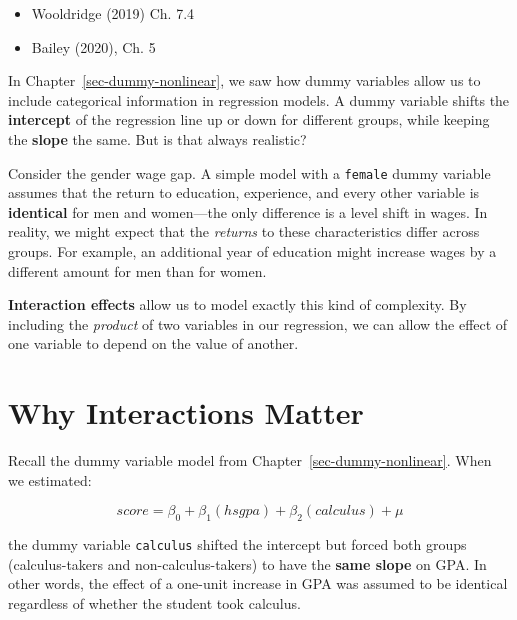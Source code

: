 \documentclass[
  letterpaper,
  DIV=11,
  numbers=noendperiod]{scrreprt}
\providecommand{\tightlist}{%
  \setlength{\itemsep}{0pt}\setlength{\parskip}{0pt}}
\begin{document}
\begin{tcolorbox}[enhanced jigsaw, arc=.35mm, bottomrule=.15mm, bottomtitle=1mm, breakable, colback=white, colbacktitle=quarto-callout-note-color!10!white, colframe=quarto-callout-note-color-frame, coltitle=black, left=2mm, leftrule=.75mm, opacityback=0, opacitybacktitle=0.6, rightrule=.15mm, title=\textcolor{quarto-callout-note-color}{\faInfo}\hspace{0.5em}{\textbf{Suggested Readings}}, titlerule=0mm, toprule=.15mm, toptitle=1mm]

\begin{itemize}
\tightlist
\item
  Wooldridge (2019) Ch. 7.4
\item
  Bailey (2020), Ch. 5
\end{itemize}

\end{tcolorbox}

In Chapter~\ref{sec-dummy-nonlinear}, we saw how dummy variables allow
us to include categorical information in regression models. A dummy
variable shifts the \textbf{intercept} of the regression line up or down
for different groups, while keeping the \textbf{slope} the same. But is
that always realistic?

Consider the gender wage gap. A simple model with a \texttt{female}
dummy variable assumes that the return to education, experience, and
every other variable is \textbf{identical} for men and women---the only
difference is a level shift in wages. In reality, we might expect that
the \emph{returns} to these characteristics differ across groups. For
example, an additional year of education might increase wages by a
different amount for men than for women.

\textbf{Interaction effects} allow us to model exactly this kind of
complexity. By including the \emph{product} of two variables in our
regression, we can allow the effect of one variable to depend on the
value of another.

\section{Why Interactions Matter}\label{why-interactions-matter}

Recall the dummy variable model from Chapter~\ref{sec-dummy-nonlinear}.
When we estimated:

\[
score = \beta_0 + \beta_1(hsgpa) + \beta_2(calculus) + \mu
\]

the dummy variable \texttt{calculus} shifted the intercept but forced
both groups (calculus-takers and non-calculus-takers) to have the
\textbf{same slope} on GPA. In other words, the effect of a one-unit
increase in GPA was assumed to be identical regardless of whether the
student took calculus.
\end{document}
